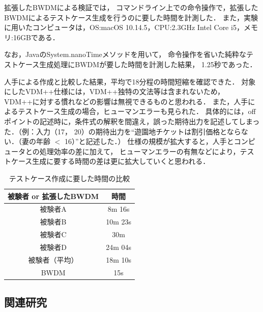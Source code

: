 \documentclass[uplatex, report, a4j, 10pt]{jsbook}
\begin{document}
拡張したBWDMによる検証では，
コマンドライン上での命令操作で，拡張したBWDMによるテストケース生成を行うのに要した時間を計測した．
また，実験に用いたコンピュータは，OS:macOS 10.14.5，CPU:2.3GHz Intel Core i5，メモリ:16GBである．

なお，JavaのSystem.nanoTime\cite{nanotime}メソッドを用いて，
命令操作を省いた純粋なテストケース生成処理にBWDMが要した時間を計測した結果，
1.25秒であった．

人手による作成と比較した結果，平均で18分程の時間短縮を確認できた．
対象にしたVDM++仕様には，VDM++独特の文法等は含まれないため，
VDM++に対する慣れなどの影響は無視できるものと思われる．
また，人手によるテストケース生成の場合，ヒューマンエラーも見られた．
具体的には，offポイントの記述時に，条件式の解釈を間違え，誤った期待出力を記述してしまった．（例：入力（17， 20）の期待出力を“遊園地チケットは割引価格とならない．（妻の年齢 $<$ 16）”と記述した．）
仕様の規模が拡大すると，人手とコンピュータとの処理効率の差に加えて，
ヒューマンエラーの有無などにより，テストケース生成に要する時間の差は更に拡大していくと思われる．

\begin{table}[t]
  \begin{center}
    \caption{テストケース作成に要した時間の比較}
    \label{tab:time}
    \begin{tabular}{c|c}
      被験者 or 拡張したBWDM & 時間    \\
      \hline
      \hline
      被験者A                & 8m 16s  \\
      被験者B                & 10m 23s \\
      被験者C                & 30m     \\
      被験者D                & 24m 04s \\
      被験者（平均）         & 18m 10s \\
      BWDM                   & 15s     \\
      \hline
    \end{tabular}
  \end{center}
\end{table}

\subsection{関連研究}

\end{document}
